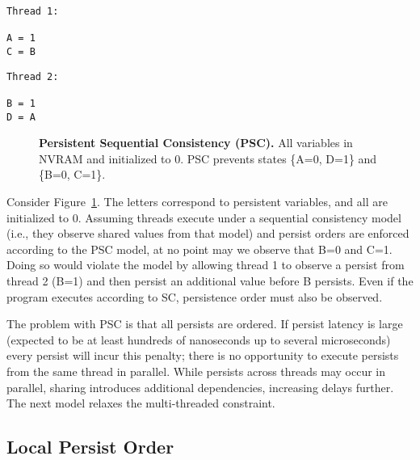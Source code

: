 {
\singlespacing
\newsavebox{\PSCThreadOne}
\begin{lrbox}{\PSCThreadOne}
  \begin{lstlisting}
Thread 1:

A = 1
C = B
  \end{lstlisting}
\end{lrbox}

\newsavebox{\PSCThreadTwo}
\begin{lrbox}{\PSCThreadTwo}
  \begin{lstlisting}
Thread 2:

B = 1
D = A
  \end{lstlisting}
\end{lrbox}

\begin{figure}[]
\centering
\subfigure{ \usebox{\PSCThreadOne} }
\hspace{1 in}
\subfigure{ \usebox{\PSCThreadTwo} }
\caption{\textbf{Persistent Sequential Consistency (PSC).} All variables in NVRAM and initialized to 0.  PSC prevents states \{A=0, D=1\} and \{B=0, C=1\}.}
\label{fig:PSC}
\end{figure}
}

Consider Figure~\ref{fig:PSC}.
The letters correspond to persistent variables, and all are initialized to 0.
Assuming threads execute under a sequential consistency model (i.e., they observe shared values from that model) and persist orders are enforced according to the PSC model, at no point may we observe that B=0 and C=1.
Doing so would violate the model by allowing thread 1 to observe a persist from thread 2 (B=1) and then persist an additional value before B persists.
Even if the program executes according to SC, persistence order must also be observed.

The problem with PSC is that all persists are ordered.
If persist latency is large (expected to be at least hundreds of nanoseconds up to several microseconds) every persist will incur this penalty; there is no opportunity to execute persists from the same thread in parallel.
While persists across threads may occur in parallel, sharing introduces additional dependencies, increasing delays further.
The next model relaxes the multi-threaded constraint.

\subsection{Local Persist Order}
\label{sec:PMC:PersistenceModels:LPO}

